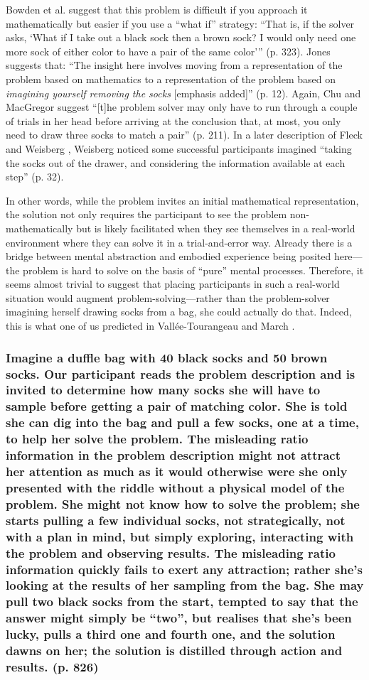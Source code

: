 \documentclass{article}
\begin{document}
Bowden et al. \parencite[323][]{Bowden2005} suggest that this problem is difficult if you approach it mathematically but easier if you use a “what if” strategy: “That is, if the solver asks, ‘What if I take out a black sock then a brown sock? I would only need one more sock of either color to have a pair of the same color'” (p. 323). Jones \parencite[12][]{Jones2003} suggests that: “The insight here involves moving from a representation of the problem based on mathematics to a representation of the problem based on \emph{imagining yourself removing the socks }[emphasis added]” (p. 12). Again, Chu and MacGregor \parencite[211][]{Chu2011} suggest “[t]he problem solver may only have to run through a couple of trials in her head before arriving at the conclusion that, at most, you only need to draw three socks to match a pair” (p. 211). In a later description of Fleck and Weisberg \parencite{Fleck2013}, Weisberg \parencite[32][]{Weisberg2015} noticed some successful participants imagined “taking the socks out of the drawer, and considering the information available at each step” (p. 32).

In other words, while the problem invites an initial mathematical representation, the solution not only requires the participant to see the problem non-mathematically but is likely facilitated when they see themselves in a real-world environment where they can solve it in a trial-and-error way. Already there is a bridge between mental abstraction and embodied experience being posited here—the problem is hard to solve on the basis of “pure” mental processes. Therefore, it seems almost trivial to suggest that placing participants in such a real-world situation would augment problem-solving—rather than the problem-solver imagining herself drawing socks from a bag, she could actually do that. Indeed, this is what one of us predicted in Vallée-Tourangeau and March \parencite[3][]{Vallée-Tourangeau2019}. 

\subsubsection{Imagine a duffle bag with 40 black socks and 50 brown socks. Our participant reads the problem description and is invited to determine how many socks she will have to sample before getting a pair of matching color. She is told she can dig into the bag and pull a few socks, one at a time, to help her solve the problem. The misleading ratio information in the problem description might not attract her attention as much as it would otherwise were she only presented with the riddle without a physical model of the problem. She might not know how to solve the problem; she starts pulling a few individual socks, not strategically, not with a plan in mind, but simply exploring, interacting with the problem and observing results. The misleading ratio information quickly fails to exert any attraction; rather she's looking at the results of her sampling from the bag. She may pull two black socks from the start, tempted to say that the answer might simply be “two”, but realises that she's been lucky, pulls a third one and fourth one, and the solution dawns on her; the solution is distilled through action and results. (p. 826)}
\end{document}

